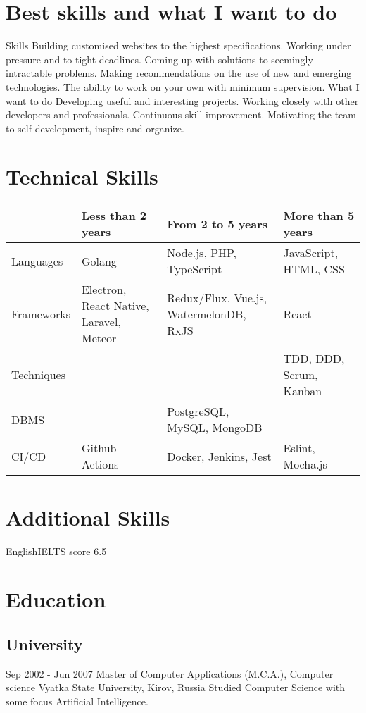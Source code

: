 \documentclass[11pt,a4paper]{moderncv}
\begin{document}
\maketitle
\section{Best skills and what I want to do}
  \cvline
    {Skills}{
      Building customised websites to the highest specifications.
      Working under pressure and to tight deadlines.
      Coming up with solutions to seemingly intractable problems.
      Making recommendations on the use of new and emerging technologies.
      The ability to work on your own with minimum supervision.}
  \cvline
    {What I want to do}{
      Developing useful and interesting projects.
      Working closely with other developers and professionals.
      Continuous skill improvement.
      Motivating the team to self-development, inspire and organize.}

\section{Technical Skills}

\begin{tabular}{ l||m{4cm}|m{4cm}|m{4cm}|  }
  & Less than 2 years & From 2 to 5 years & More than 5 years \\
  \hline\hline
  Languages & Golang & Node.js, PHP, TypeScript & JavaScript, HTML, CSS \\
  \hline
  Frameworks & Electron, React Native, Laravel, Meteor & Redux/Flux, Vue.js, WatermelonDB, RxJS & React \\
  \hline
  Techniques & & & TDD, DDD, Scrum, Kanban \\
  \hline
  DBMS & & PostgreSQL, MySQL, MongoDB & \\
  \hline
  CI/CD & Github Actions & Docker, Jenkins, Jest & Eslint, Mocha.js \\
  \hline
\end{tabular}

\section{Additional Skills}
  \cvline
    {English}{IELTS score 6.5}

\section{Education}
  \subsection{University}
  \cventry
    {Sep 2002 - Jun 2007}
    {Master of Computer Applications (M.C.A.), Computer science}
    {\newline Vyatka State University, Kirov, Russia}
    {}{}
    {Studied Computer Science with some focus Artificial Intelligence.}
\end{document}
